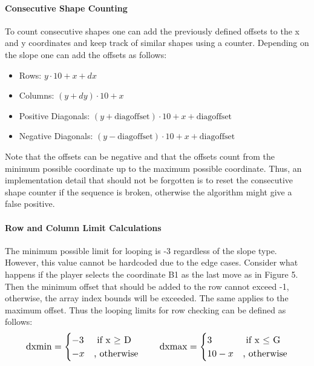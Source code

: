 \documentclass[conference]{IEEEtran}
\begin{document}
\paragraph{Consecutive Shape Counting}
To count consecutive shapes one can add the previously defined offsets to the x and y coordinates and keep track of similar shapes using a counter. Depending on the slope one can add the offsets as follows:
\begin{itemize}
\item Rows: \(y \cdot 10 + x + dx \)
\item Columns: \((y + dy) \cdot 10 + x\) 
\item Positive Diagonals: \((y + \text{diagoffset}) \cdot 10 + x + \text{diagoffset}\)
\item Negative Diagonals: \((y - \text{diagoffset}) \cdot 10 + x + \text{diagoffset}\)
\end{itemize} \hfill \hfill
\par Note that the offsets can be negative and that the offsets count from the minimum possible coordinate up to the maximum possible coordinate. Thus, an implementation detail that should not be forgotten is to reset the consecutive shape counter if the sequence is broken, otherwise the algorithm might give a false positive. \\
\paragraph{Row and Column Limit Calculations} The minimum possible limit for looping is -3 regardless of the slope type. However, this value cannot be hardcoded due to the edge cases. Consider what happens if the player selects the coordinate B1 as the last move as in Figure 5. Then the minimum offset that should be added to the row cannot exceed -1, otherwise, the array index bounds will be exceeded. The same applies to the maximum offset. Thus the looping limits for row checking can be defined as follows: \begin{gather*}\resizebox{0.9\hsize}{!}{$
\text{dxmin} =
\begin{cases}
 -3 &\text{ if x \(\geq\) D} \\ -x &\text{, otherwise} 
\end{cases} \qquad 
\text{dxmax} =
\begin{cases}
 3 &\text{ if x \(\leq\) G} \\ 10-x &\text{, otherwise} 
\end{cases}$}
\end{gather*}
\end{document}
